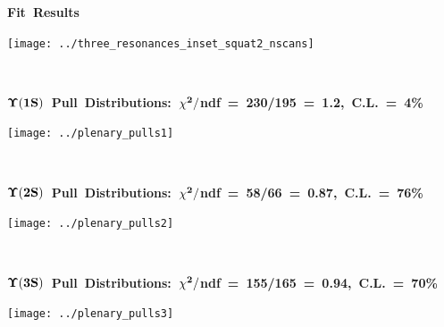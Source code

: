 \documentclass[landscape]{article}
\newenvironment{slide}[1][ ]{\mbox{\bf #1 } \vfill}{\vfill \mbox{ } \pagebreak}
\begin{document}
\begin{slide}[Fit Results]

  \vspace{0.6 cm}
  \begin{center}
    \texttt{[image: ../three\_resonances\_inset\_squat2\_nscans]}
  \end{center}

  \vspace{-0.6 cm}
\end{slide}

\begin{slide}[$\bf \Upsilon(1S)$ Pull Distributions: $\bf \chi^2/$ndf = 230/195 = 1.2, C.L. = 4\%]
  \begin{center}
    \texttt{[image: ../plenary\_pulls1]}
  \end{center}
\end{slide}

\begin{slide}[$\bf \Upsilon(2S)$ Pull Distributions: $\bf \chi^2/$ndf = 58/66 = 0.87, C.L. = 76\%]
  \begin{center}
    \texttt{[image: ../plenary\_pulls2]}
  \end{center}
\end{slide}

\begin{slide}[$\bf \Upsilon(3S)$ Pull Distributions: $\bf \chi^2/$ndf = 155/165 = 0.94, C.L. = 70\%]
  \begin{center}
    \texttt{[image: ../plenary\_pulls3]}
  \end{center}
\end{slide}
\end{document}
